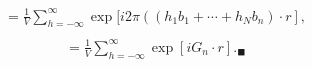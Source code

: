 \begin{questions}
\begin{solution}
\begin{equation*}
\begin{aligned}
      &=\frac{1}{V}  \sum_{h=-\infty}^\infty \exp[ i2\pi \left((h_1b_1+\cdots+ h_Nb_n)\cdot r \right],\\
    \end{aligned}
  \end{equation*}
      \begin{equation}
        \begin{aligned}
          &= \frac{1}{V}  \sum_{h=-\infty}^\infty \exp[iG_n\cdot r]. _\blacksquare
        \end{aligned}
          \end{equation}
\end{solution}
\end{questions}

%
%
